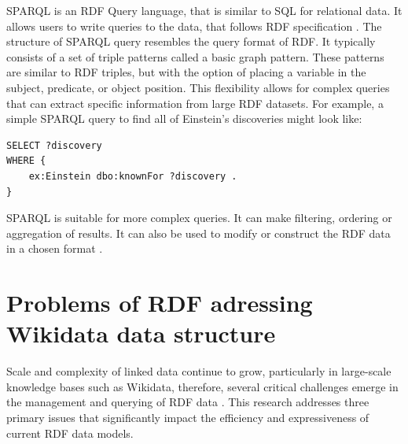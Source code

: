 SPARQL is an RDF Query language, that is similar to SQL for relational data. It allows users to write queries to the data, that follows RDF specification \citep{harris2013sparql}. The structure of SPARQL query resembles the query format of RDF. It typically consists of a set of triple patterns called a basic graph pattern. These patterns are similar to RDF triples, but with the option of placing a variable in the subject, predicate, or object position. This flexibility allows for complex queries that can extract specific information from large RDF datasets. For example, a simple SPARQL query to find all of Einstein's discoveries might look like:

{\footnotesize
\begin{verbatim}
SELECT ?discovery
WHERE {
    ex:Einstein dbo:knownFor ?discovery .
}
\end{verbatim}
}

SPARQL is suitable for more complex queries. It can make filtering, ordering or aggregation of results. It can also be used to modify or construct the RDF data in a chosen format \citep{perez2009semantics}.




\section{Problems of RDF adressing Wikidata data structure}

Scale and complexity of linked data continue to grow, particularly in large-scale knowledge bases such as Wikidata, therefore, several critical challenges emerge in the management and querying of RDF data \citep{fernandez2018hdtq}. This research addresses three primary issues that significantly impact the efficiency and expressiveness of current RDF data models.

